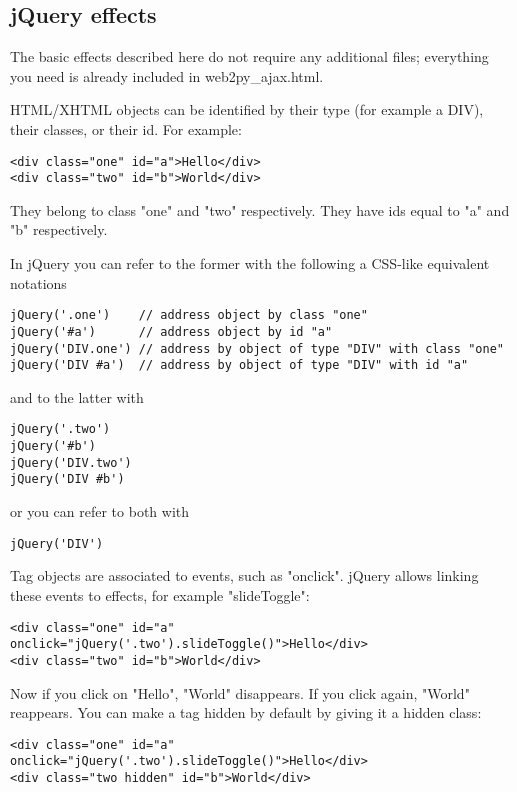\documentclass[justified,sixbynine,notoc]{tufte-book}
\def\inxx#1{\index{#1}}
\begin{document}
\begin{fullwidth}
\goodbreak\section{jQuery effects}

\inxx{effects}

The basic effects described here do not require any additional files; everything you need is already included in web2py\_ajax.html.

HTML/XHTML objects can be identified by their type (for example a DIV), their classes, or their id. For example:
\begin{lstlisting}[keywords={}]
<div class="one" id="a">Hello</div>
<div class="two" id="b">World</div>
\end{lstlisting}

They belong to class "one" and "two" respectively. They have ids equal to "a" and "b" respectively.

In jQuery you can refer to the former with the following a CSS-like equivalent notations
\begin{lstlisting}
jQuery('.one')    // address object by class "one"
jQuery('#a')      // address object by id "a"
jQuery('DIV.one') // address by object of type "DIV" with class "one"
jQuery('DIV #a')  // address by object of type "DIV" with id "a"
\end{lstlisting}
\noindent and to the latter with
\begin{lstlisting}
jQuery('.two')
jQuery('#b')
jQuery('DIV.two')
jQuery('DIV #b')
\end{lstlisting}
\noindent or you can refer to both with
\begin{lstlisting}
jQuery('DIV')
\end{lstlisting}

Tag objects are associated to events, such as "onclick". jQuery allows linking these events to effects, for example "slideToggle":
\begin{lstlisting}[keywords={}]
<div class="one" id="a" onclick="jQuery('.two').slideToggle()">Hello</div>
<div class="two" id="b">World</div>
\end{lstlisting}

Now if you click on "Hello", "World" disappears. If you click again, "World" reappears. You can make a tag hidden by default by giving it a hidden class:

\begin{lstlisting}[keywords={}]
<div class="one" id="a" onclick="jQuery('.two').slideToggle()">Hello</div>
<div class="two hidden" id="b">World</div>
\end{lstlisting}


\end{fullwidth}
\end{document}
